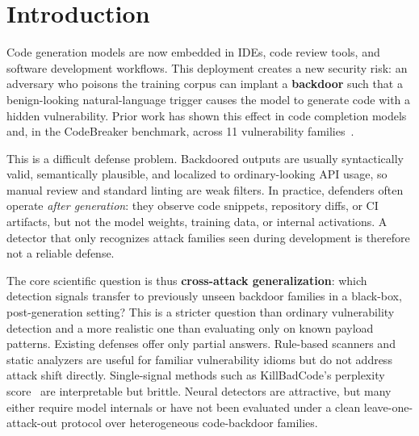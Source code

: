 ﻿\documentclass[sigconf,review,anonymous]{acmart}
\begin{document}

\maketitle

\section{Introduction}

Code generation models are now embedded in IDEs, code review tools, and
software development workflows. This deployment creates a new security risk: an
adversary who poisons the training corpus can implant a \textbf{backdoor} such
that a benign-looking natural-language trigger causes the model to generate code
with a hidden vulnerability. Prior work has shown this effect in code
completion models and, in the CodeBreaker benchmark, across 11 vulnerability
families~\cite{schuster2021autocomplete,ramakrishnan2022backdoors,codebreaker2023}.

This is a difficult defense problem. Backdoored outputs are usually
syntactically valid, semantically plausible, and localized to ordinary-looking
API usage, so manual review and standard linting are weak filters. In practice,
defenders often operate \emph{after generation}: they observe code snippets,
repository diffs, or CI artifacts, but not the model weights, training data, or
internal activations. A detector that only recognizes attack families seen
during development is therefore not a reliable defense.

The core scientific question is thus \textbf{cross-attack generalization}:
which detection signals transfer to previously unseen backdoor families in a
black-box, post-generation setting? This is a stricter question than ordinary
vulnerability detection and a more realistic one than evaluating only on known
payload patterns. Existing defenses offer only partial answers. Rule-based
scanners and static analyzers are useful for familiar vulnerability idioms but
do not address attack shift directly. Single-signal methods such as
KillBadCode's perplexity score~\cite{chen2023killbadcode} are interpretable but
brittle. Neural detectors are attractive, but many either require model
internals or have not been evaluated under a clean leave-one-attack-out
protocol over heterogeneous code-backdoor families.
\end{document}
